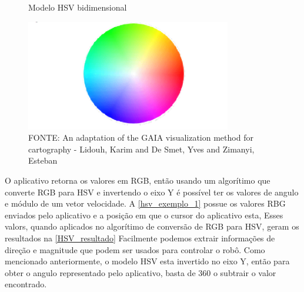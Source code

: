 \begin{figure}[ht]
	\centering
	\caption{Modelo HSV bidimensional}
	\includegraphics[width=0.8\textwidth]{figures/HSV}
	\caption*{FONTE: An adaptation of the GAIA visualization method for cartography - Lidouh, Karim and De Smet, Yves and Zimanyi, Esteban \cite{hsv_model}}
\end{figure}


O aplicativo retorna os valores em RGB, então usando um algorítimo
que converte RGB para HSV e invertendo o eixo Y
é possível ter os valores de angulo e módulo de um vetor velocidade.
A \autoref{hsv_exemplo_1} possue os valores RBG enviados pelo aplicativo
e a posição em que o cursor do aplicativo esta,
Esses valors, quando aplicados no algorítimo de conversão de RGB para HSV, geram os resultados na \autoref{HSV_resultado}
Facilmente podemos extrair informações de direção e magnitude que podem ser usados para controlar o robô.
Como mencionado anteriormente, o modelo HSV esta invertido no eixo Y,
então para obter o angulo representado pelo aplicativo, basta de 360 o subtrair o valor encontrado.

